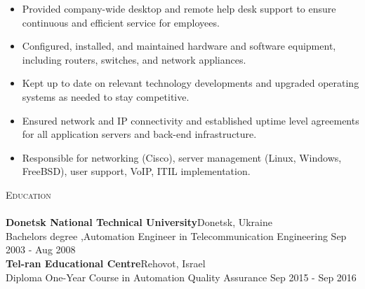 \documentclass[a4paper]{article}
\newcommand{\lineunder} {
    \vspace*{-8pt} \\
    \hspace*{-18pt} \hrulefill \\
}
\newcommand{\header} [1] {
    {\hspace*{-18pt}\vspace*{6pt} \textsc{#1}}
    \vspace*{-6pt} \lineunder
}
\begin{document}
\vspace{-1mm}
\begin{itemize} \itemsep 1pt
	\item 	Provided company-wide desktop and remote help desk support to ensure continuous and efficient service for employees.
	\item 	Configured, installed, and maintained hardware and software equipment, including routers, switches, and network appliances.
	\item 	Kept up to date on relevant technology developments and upgraded operating systems as needed to stay competitive.
	\item 	Ensured network and IP connectivity and established uptime level agreements for all application servers and back-end infrastructure.
	\item 	Responsible for networking (Cisco), server management (Linux, Windows, FreeBSD), user support, VoIP, ITIL implementation.
\end{itemize}

\header{Education}
\textbf{Donetsk National Technical University}\hfill Donetsk, Ukraine\\
Bachelor\textquotesingle{}s degree ,Automation Engineer in Telecommunication Engineering \hfill Sep 2003 - Aug 2008\\
\vspace{2mm}
\textbf{Tel-ran Educational Centre}\hfill Rehovot, Israel\\
Diploma One-Year Course in Automation Quality Assurance \hfill Sep 2015 - Sep 2016\\
\vspace{2mm} 
\end{document}
